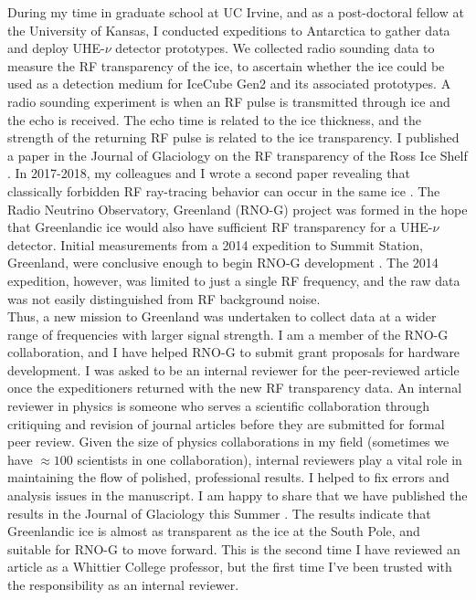 \documentclass[../../../main.tex]{subfiles}
\begin{document}
During my time in graduate school at UC Irvine, and as a post-doctoral fellow at the University of Kansas, I conducted expeditions to Antarctica to gather data and deploy UHE-$\nu$ detector prototypes.  We collected radio sounding data to measure the RF transparency of the ice, to ascertain whether the ice could be used as a detection medium for IceCube Gen2 and its associated prototypes.  A radio sounding experiment is when an RF pulse is transmitted through ice and the echo is received.  The echo time is related to the ice thickness, and the strength of the returning RF pulse is related to the ice transparency.  I published a paper in the Journal of Glaciology on the RF transparency of the Ross Ice Shelf \cite{10.3189/2015jog14j214}.  In 2017-2018, my colleagues and I wrote a second paper revealing that classically forbidden RF ray-tracing behavior can occur in the same ice \cite{Barwick:2018497}.  The Radio Neutrino Observatory, Greenland (RNO-G) project was formed in the hope that Greenlandic ice would also have sufficient RF transparency for a UHE-$\nu$ detector.  Initial measurements from a 2014 expedition to Summit Station, Greenland, were conclusive enough to begin RNO-G development \cite{10.3189/2015jog15j057}.  The 2014 expedition, however, was limited to just a single RF frequency, and the raw data was not easily distinguished from RF background noise.
\\
\vspace{0.15cm}
Thus, a new mission to Greenland was undertaken to collect data at a wider range of frequencies with larger signal strength.  I am a member of the RNO-G collaboration, and I have helped RNO-G to submit grant proposals for hardware development.  I was asked to be an internal reviewer for the peer-reviewed article once the expeditioners returned with the new RF transparency data.  An internal reviewer in physics is someone who serves a scientific collaboration through critiquing and revision of journal articles before they are submitted for formal peer review.  Given the size of physics collaborations in my field (sometimes we have $\approx 100$ scientists in one collaboration), internal reviewers play a vital role in maintaining the flow of polished, professional results.  I helped to fix errors and analysis issues in the manuscript.  I am happy to share that we have published the results in the Journal of Glaciology this Summer \cite{aguilar_2022}.  The results indicate that Greenlandic ice is almost as transparent as the ice at the South Pole, and suitable for RNO-G to move forward.  This is the second time I have reviewed an article as a Whittier College professor, but the first time I've been trusted with the responsibility as an internal reviewer.
\end{document}
